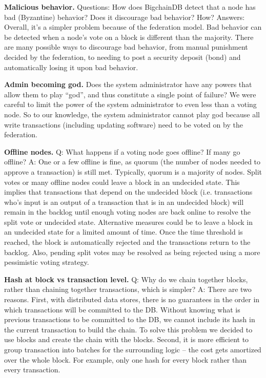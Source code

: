 \medskip
\noindent\textbf{Malicious behavior.} Questions: How does BigchainDB detect that a node has bad (Byzantine) behavior? 
Does it discourage bad behavior? How? 
Answers: Overall, it’s a simpler problem because of the federation model. 
Bad behavior can be detected when a node’s vote on a block is different than the majority. 
There are many possible ways to discourage bad behavior, from manual punishment decided by the federation, to needing to post a security deposit (bond) and automatically losing it upon bad behavior. 

\medskip
\noindent\textbf{Admin becoming god.} Does the system administrator have any powers that allow them to play “god”, and thus constitute a single point of failure? 
We were careful to limit the power of the system administrator to even less than a voting node. 
So to our knowledge, the system administrator cannot play god because all write transactions (including updating software) need to be voted on by the federation. 

\medskip
\noindent\textbf{Offline nodes.} Q: What happens if a voting node goes offline? If many go offline? 
A: One or a few offline is fine, as quorum (the number of nodes needed to approve a transaction) is still met. 
Typically, quorum is a majority of nodes. Split votes or many offline nodes could leave a block in an undecided state. 
This implies that transactions that depend on the undecided block (i.e. transactions who’s input is an output of a transaction that is in an undecided block) will remain in the backlog until enough voting nodes are back online to resolve the split vote or undecided state. 
Alternative measures could be to leave a block in an undecided state for a limited amount of time. 
Once the time threshold is reached, the block is automatically rejected and the transactions return to the backlog. 
Also, pending split votes may be resolved as being rejected using a more pessimistic voting strategy. 

\medskip
\noindent\textbf{Hash at block vs transaction level.} Q: Why do we chain together blocks, rather than chaining together transactions, which is simpler? 
A: There are two reasons. 
First, with distributed data stores, there is no guarantees in the order in which transactions will be committed to the DB. 
Without knowing what is previous transactions to be committed to the DB, we cannot include its hash in the current transaction to build the chain. 
To solve this problem we decided to use blocks and create the chain with the blocks. 
Second, it is more efficient to group transaction into batches for the surrounding logic – the cost gets amortized over the whole block. 
For example, only one hash for every block rather than every transaction.


